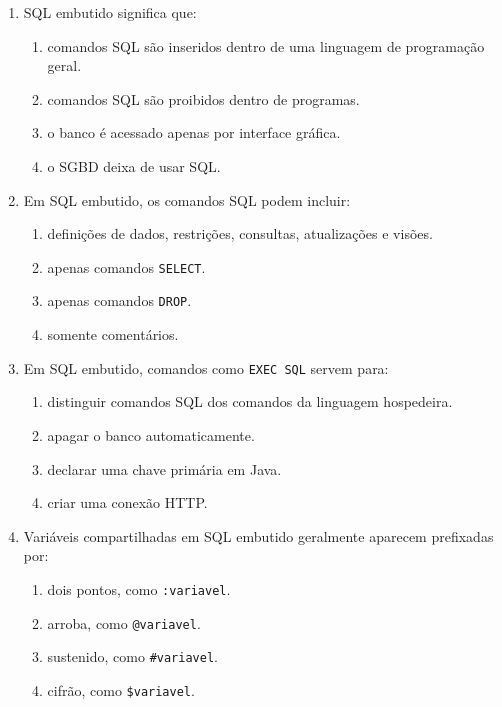 \documentclass[12pt,a4paper]{article}
\begin{document}
\begin{enumerate}[label=\textbf{Q\arabic*.}]
\item SQL embutido significa que:

\begin{enumerate}[label=\alph*)]
    \item comandos SQL são inseridos dentro de uma linguagem de programação geral.
    \item comandos SQL são proibidos dentro de programas.
    \item o banco é acessado apenas por interface gráfica.
    \item o SGBD deixa de usar SQL.
\end{enumerate}

\item Em SQL embutido, os comandos SQL podem incluir:

\begin{enumerate}[label=\alph*)]
    \item definições de dados, restrições, consultas, atualizações e visões.
    \item apenas comandos \texttt{SELECT}.
    \item apenas comandos \texttt{DROP}.
    \item somente comentários.
\end{enumerate}

\item Em SQL embutido, comandos como \texttt{EXEC SQL} servem para:

\begin{enumerate}[label=\alph*)]
    \item distinguir comandos SQL dos comandos da linguagem hospedeira.
    \item apagar o banco automaticamente.
    \item declarar uma chave primária em Java.
    \item criar uma conexão HTTP.
\end{enumerate}

\item Variáveis compartilhadas em SQL embutido geralmente aparecem prefixadas por:

\begin{enumerate}[label=\alph*)]
    \item dois pontos, como \texttt{:variavel}.
    \item arroba, como \texttt{@variavel}.
    \item sustenido, como \texttt{\#variavel}.
    \item cifrão, como \texttt{\$variavel}.
\end{enumerate}


\end{enumerate}
\end{document}
